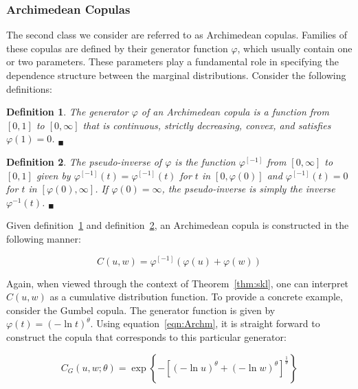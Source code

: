 \documentclass[12pt]{article}
\newtheorem{defn}{Definition}
\begin{document}
\subsubsection{Archimedean Copulas}

The second class we consider are referred to as Archimedean copulas. Families of these copulas are defined by their generator function $\varphi$, which usually contain one or two parameters. These parameters play a fundamental role in specifying the dependence structure between the marginal distributions. Consider the following definitions:

\begin{defn} \label{def:Arch1}
	The generator $\varphi$ of an Archimedean copula is a function from $\left[0,1\right]$ to $\left[0,\infty\right]$ that is continuous, strictly decreasing, convex, and satisfies $\varphi\left(1\right) = 0$. $_{\blacksquare}$
\end{defn}

\begin{defn} \label{def:Arch2}
	The pseudo-inverse of $\varphi$ is the function $\varphi^{\left[-1\right]}$ from $\left[0,\infty\right]$ to $\left[0,1\right]$ given by $\varphi^{\left[-1\right]}\left(t\right) = \varphi^{\left[-1\right]}\left(t\right)$ for $t$ in $\left[0,\varphi\left(0\right)\right]$ and $\varphi^{\left[-1\right]}\left(t\right) = 0$ for $t$ in $\left[\varphi\left(0\right),\infty\right]$. If $\varphi\left(0\right) = \infty$, the pseudo-inverse is simply the inverse $\varphi^{-1}\left(t\right)$. $_{\blacksquare}$
\end{defn}

Given definition~\ref{def:Arch1} and definition~\ref{def:Arch2}, an Archimedean copula is constructed in the following manner:

\begin{equation} \label{eqn:Archm}
	C\left(u,w\right) = \varphi^{\left[-1\right]}\left(\varphi\left(u\right)+\varphi\left(w\right)\right)
\end{equation}

Again, when viewed through the context of Theorem~\ref{thm:skl}, one can interpret $C\left(u,w\right)$ as a cumulative distribution function. To provide a concrete example, consider the Gumbel copula. The generator function is given by $\varphi\left(t\right) = \left(-\ln t\right)^{\theta}$. Using equation~\ref{eqn:Archm}, it is straight forward to construct the copula that corresponds to this particular generator:

\begin{equation} \label{eqn:Gumbel}
	C_{G}\left(u,w;\theta\right) = \exp\left\{-\left[\left(-\ln u\right)^{\theta}+\left( -\ln w\right)^{\theta }\right]^{\frac{1}{\theta}}\right\}
\end{equation}
\end{document}

